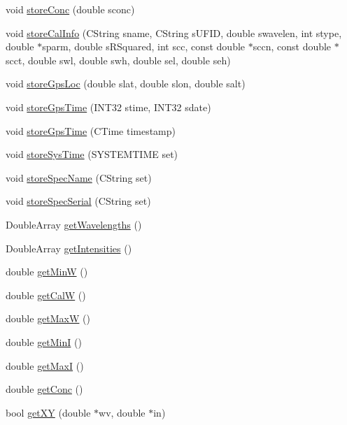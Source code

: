 \begin{DoxyCompactItemize}
\item 
void \hyperlink{classCSpectrumData_aa374ef482243fe9cd75293c9f38a5b3e}{storeConc} (double sconc)
\item 
void \hyperlink{classCSpectrumData_ae63b8a2bb87f1d8345a3731b39f34116}{storeCalInfo} (CString sname, CString sUFID, double swavelen, int stype, double $\ast$sparm, double sRSquared, int scc, const double $\ast$sccn, const double $\ast$scct, double swl, double swh, double sel, double seh)
\item 
void \hyperlink{classCSpectrumData_a7246c10ec18b55342a0f5d037ce77bef}{storeGpsLoc} (double slat, double slon, double salt)
\item 
void \hyperlink{classCSpectrumData_a6cf6246fda69ced5e2c91fa70549e70c}{storeGpsTime} (INT32 stime, INT32 sdate)
\item 
void \hyperlink{classCSpectrumData_ac5b72ca9a7b7b5a4301f294cb4f2b867}{storeGpsTime} (CTime timestamp)
\item 
void \hyperlink{classCSpectrumData_a1050a3cf6a46b84cdbdca44b98c970fc}{storeSysTime} (SYSTEMTIME set)
\item 
void \hyperlink{classCSpectrumData_a4eff3c5fbd12f362a9c92143483e0e85}{storeSpecName} (CString set)
\item 
void \hyperlink{classCSpectrumData_a33c0fb36a0cc85b4ef2a6457e754eb23}{storeSpecSerial} (CString set)
\item 
DoubleArray \hyperlink{classCSpectrumData_a812b56940bec6357a9a8501feff23628}{getWavelengths} ()
\item 
DoubleArray \hyperlink{classCSpectrumData_a889c7760331b556e03cb349c782bcba5}{getIntensities} ()
\item 
double \hyperlink{classCSpectrumData_aa492fe388aee51cc74ed0cc7b68844db}{getMinW} ()
\item 
double \hyperlink{classCSpectrumData_aafe9f754ffe9d54c82a4c7bcb2ae3858}{getCalW} ()
\item 
double \hyperlink{classCSpectrumData_a2d4dafcddf484d3d8794b1fdc01e716a}{getMaxW} ()
\item 
double \hyperlink{classCSpectrumData_a992e97e1f517d6099d4dc33c36168fa3}{getMinI} ()
\item 
double \hyperlink{classCSpectrumData_a9bc317aedb590999b734166e289b8e91}{getMaxI} ()
\item 
double \hyperlink{classCSpectrumData_aed7d9d942026e37b873fb5f3700b98fd}{getConc} ()
\item 
bool \hyperlink{classCSpectrumData_a5d1476ef5ff0a58c1427de8b7329f5e4}{getXY} (double $\ast$wv, double $\ast$in)

\end{DoxyCompactItemize}
